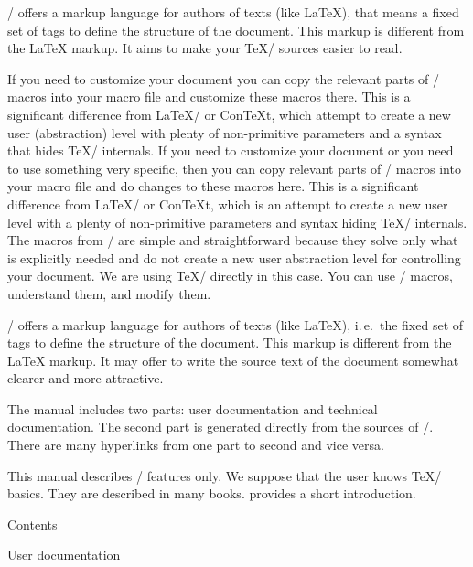 \OpTeX/ offers a markup language for authors of texts (like \LaTeX),
that means a fixed set of tags to define the structure of the document. This
markup is different from the \LaTeX{} markup.
It aims to make your \TeX/ sources easier to read.

If you need to customize your document you can copy the relevant parts
of \OpTeX/ macros into your macro file and customize these macros there.
This is a significant difference from
\LaTeX/ or ConTeXt, which attempt to create a new user (abstraction) level with
plenty of non-primitive parameters and a syntax that hides \TeX/ internals.
If you need to customize your document or you need to use something
very specific, then you can copy relevant parts of \OpTeX/ macros into your macro
file and do changes to these macros here. This is a significant difference from
\LaTeX/ or ConTeXt, which is an attempt to create a new user level with a
plenty of non-primitive parameters and syntax hiding \TeX/ internals.
The macros from \OpTeX/ are simple and straightforward because they solve only
what is explicitly needed and do not create a new user abstraction level for
controlling your document.  We are using \TeX/ directly in this case.
You can use \OpTeX/ macros, understand them, and modify them.

\OpTeX/ offers a markup language for authors of texts (like \LaTeX),
i.\,e.\ the fixed set of tags to define the structure of the document. This
markup is different from the \LaTeX{} markup. It may offer to write the
source text of the document somewhat clearer and more attractive.

The manual includes two parts: user documentation and technical
documentation. The second part is generated directly from the sources of
\OpTeX/. There are many hyperlinks from one part to second and vice versa.

This manual describes \OpTeX/ features only. We suppose that the user knows \TeX/
basics. They are described in many books.  provides a short introduction.

\vfil\break

  

\notoc\nonum \sec Contents
\maketoc


\chap User documentation


\endgroup

